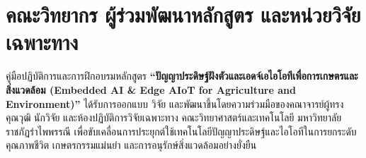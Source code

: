 \chapter{คณะวิทยากร ผู้ร่วมพัฒนาหลักสูตร และหน่วยวิจัยเฉพาะทาง}
\label{app:instructors_and_research_units}

คู่มือปฏิบัติการและการฝึกอบรมหลักสูตร \textbf{``ปัญญาประดิษฐ์ฝังตัวและเอดจ์เอไอโอทีเพื่อการเกษตรและสิ่งแวดล้อม (Embedded AI \& Edge AIoT for Agriculture and Environment)''} ได้รับการออกแบบ วิจัย และพัฒนาขึ้นโดยความร่วมมือของคณาจารย์ผู้ทรงคุณวุฒิ นักวิจัย และห้องปฏิบัติการวิจัยเฉพาะทาง คณะวิทยาศาสตร์และเทคโนโลยี มหาวิทยาลัยราชภัฏรำไพพรรณี เพื่อขับเคลื่อนการประยุกต์ใช้เทคโนโลยีปัญญาประดิษฐ์และไอโอทีในการยกระดับคุณภาพชีวิต เกษตรกรรมแม่นยำ และการอนุรักษ์สิ่งแวดล้อมอย่างยั่งยืน

\label{sec:instructor_team}

